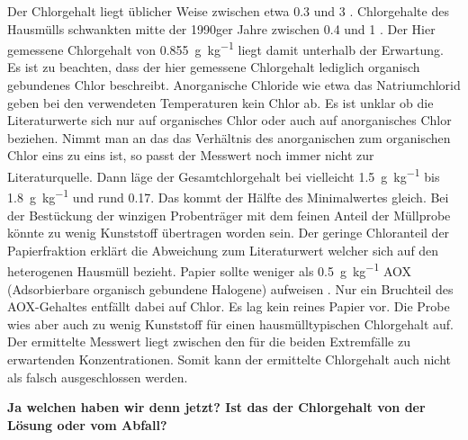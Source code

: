 Der Chlorgehalt liegt üblicher Weise zwischen etwa \SI{0,3}{\mpercent} und \SI{3}{\mpercent}  \cite{LLA_Abfallanalyse}. Chlorgehalte des Hausmülls schwankten mitte der 1990ger Jahre zwischen \SI{0,4}{\mpercent} und \SI{1}{\mpercent} \cite{scholz2013}. Der Hier gemessene Chlorgehalt von \SI{0,855}{\gram\per\kilogram} liegt damit unterhalb der Erwartung. Es ist zu beachten, dass der hier gemessene Chlorgehalt lediglich organisch gebundenes Chlor beschreibt. Anorganische Chloride wie etwa das Natriumchlorid geben bei den verwendeten Temperaturen kein Chlor ab. Es ist unklar ob die Literaturwerte sich nur auf organisches Chlor oder auch auf anorganisches Chlor beziehen. Nimmt man an das das Verhältnis des anorganischen zum organischen Chlor eins zu eins ist, so passt der Messwert noch immer nicht zur Literaturquelle. Dann läge der Gesamtchlorgehalt bei vielleicht \SI{1,5}{\gram\per\kilogram} bis \SI{1,8}{\gram\per\kilogram} und rund \SI{0,17}{\mpercent}. Das kommt der Hälfte des Minimalwertes gleich. Bei der Bestückung der winzigen Probenträger mit dem feinen Anteil der Müllprobe könnte zu wenig Kunststoff übertragen worden sein. Der geringe Chloranteil der Papierfraktion erklärt die Abweichung zum Literaturwert welcher sich auf den heterogenen Hausmüll bezieht. Papier sollte weniger als \SI{0,5}{\gram\per\kilogram} AOX (Adsorbierbare organisch gebundene Halogene) aufweisen \cite{lexikon}. Nur ein Bruchteil des AOX-Gehaltes entfällt dabei auf Chlor. Es lag kein reines Papier vor. Die Probe wies aber auch zu wenig Kunststoff für einen hausmülltypischen Chlorgehalt auf. Der ermittelte Messwert liegt zwischen den für die beiden Extremfälle zu erwartenden Konzentrationen. Somit kann der ermittelte Chlorgehalt auch nicht als falsch ausgeschlossen werden.

\textbf{Ja welchen haben wir denn jetzt? Ist das der Chlorgehalt von der Lösung oder vom Abfall?}\\



